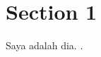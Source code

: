 \documentclass[../main.tex]{subfiles}
\begin{document}
 

\section{Section 1} 

\blindtext 

Saya adalah dia. \cite{Testliterature01}. \cite{Testliterature02}
\end{document}
